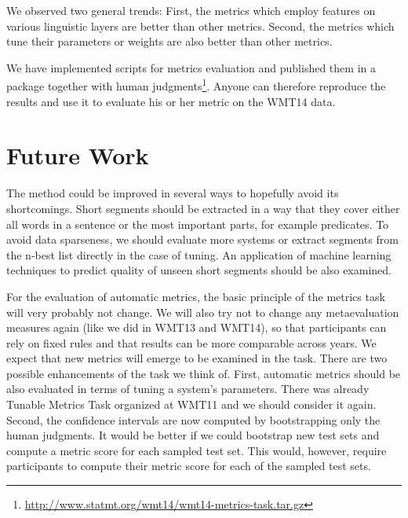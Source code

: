 We observed two general trends: First, the metrics which employ features on various
linguistic layers are better than other metrics. Second, the metrics which tune
their parameters or weights are also better than other metrics.

We have implemented scripts for metrics evaluation and published them in a
package together with human
judgments\footnote{\url{http://www.statmt.org/wmt14/wmt14-metrics-task.tar.gz}}.
Anyone can therefore reproduce the results and use it to evaluate his or her
metric on the WMT14 data.

\section{Future Work}

The  method could be improved in several ways to hopefully
avoid its shortcomings. Short segments should be extracted in a way that they
cover either all words in a sentence or the most important parts, for example
predicates. To avoid data sparseness, we should evaluate more systems or
extract segments from the n-best list directly in the case of tuning. An
application of machine learning techniques to predict quality of unseen short
segments should be also examined.

For the evaluation of automatic metrics, the basic principle of the metrics
task will very probably not change. We will also try not to change any
metaevaluation measures again (like we did in WMT13 and WMT14), so that
participants can rely on fixed rules and that results can be more comparable
across years. We expect that new metrics will emerge to be examined in the
task. There are two possible enhancements of the task we think of. First,
automatic metrics should be also evaluated in terms of tuning a system's
parameters.  There was already Tunable Metrics Task organized at WMT11 and we
should consider it again.  Second, the confidence intervals are now computed by
bootstrapping only the human judgments. It would be better if we could
bootstrap new test sets and compute a metric score for each sampled test set.
This would, however, require participants to compute their metric score for
each of the sampled test sets.


